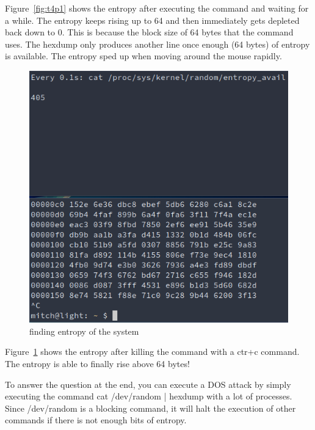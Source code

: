 \documentclass[12pt]{article}
\begin{document}
Figure~\ref{fig:t4p1} shows the entropy after executing the command and waiting for a while. The entropy keeps rising up to 64 and then immediately gets depleted back down to 0. This is because the block size of 64 bytes  that the command uses. The hexdump only produces another line once enough (64 bytes) of entropy is available. The entropy sped up when moving around the mouse rapidly.

\begin{figure}[H]
    \begin{center}
        \includegraphics[scale=0.6]{t4p2.png}
    \end{center}{}
    \caption{finding entropy of the system}
    \label{fig:t4p2}
\end{figure}

Figure~\ref{fig:t4p2} shows the entropy after killing the command with a ctr+c command. The entropy is able to finally rise above 64 bytes!

To answer the question at the end, you can execute a DOS attack by simply executing the command cat /dev/random | hexdump with a lot of processes. Since /dev/random is a blocking command, it will halt the execution of other commands if there is not enough bits of entropy.

\clearpage
\end{document}
